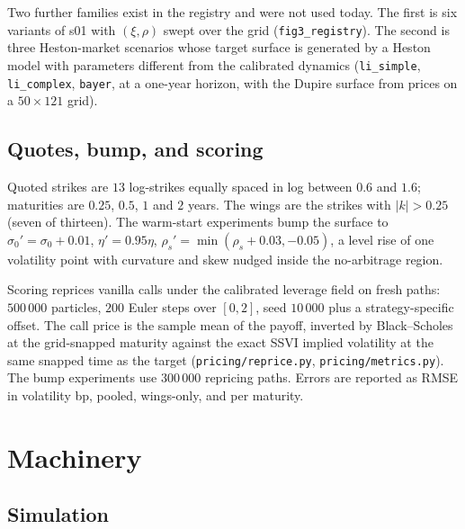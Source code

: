 \documentclass[11pt,a4paper]{article}
\newcommand{\code}[1]{\texttt{#1}}
\begin{document}
Two further families exist in the registry and were not used today. The first is six variants of s01 with $(\xi,\rho)$ swept over the grid (\code{fig3\_registry}). The second is three Heston-market scenarios whose target surface is generated by a Heston model with parameters different from the calibrated dynamics (\code{li\_simple}, \code{li\_complex}, \code{bayer}, at a one-year horizon, with the Dupire surface from prices on a $50\times121$ grid).

\subsection{Quotes, bump, and scoring}\label{sec:quotes}

Quoted strikes are $13$ log-strikes equally spaced in log between $0.6$ and $1.6$; maturities are $0.25$, $0.5$, $1$ and $2$ years. The wings are the strikes with $|k|>0.25$ (seven of thirteen). The warm-start experiments bump the surface to $\sigma_0'=\sigma_0+0.01$, $\eta'=0.95\eta$, $\rho_s'=\min(\rho_s+0.03,-0.05)$, a level rise of one volatility point with curvature and skew nudged inside the no-arbitrage region.

Scoring reprices vanilla calls under the calibrated leverage field on fresh paths: $500\,000$ particles, $200$ Euler steps over $[0,2]$, seed $10\,000$ plus a strategy-specific offset. The call price is the sample mean of the payoff, inverted by Black--Scholes at the grid-snapped maturity against the exact SSVI implied volatility at the same snapped time as the target (\code{pricing/reprice.py}, \code{pricing/metrics.py}). The bump experiments use $300\,000$ repricing paths. Errors are reported as RMSE in volatility bp, pooled, wings-only, and per maturity.

\section{Machinery}\label{sec:machinery}

\subsection{Simulation}\label{sec:sim}
\end{document}
